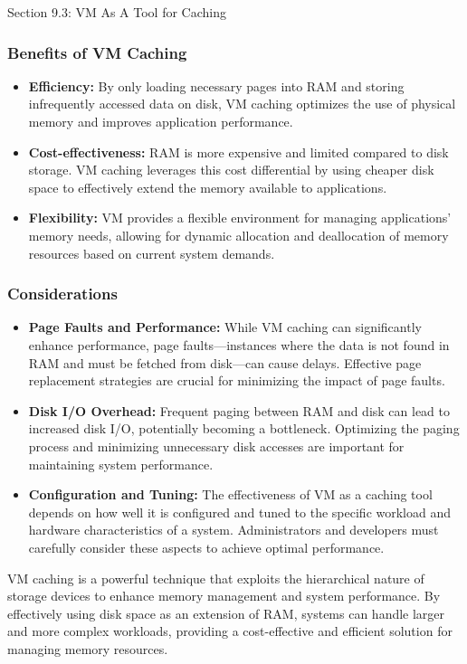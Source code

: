 \begin{notes}{Section 9.3: VM As A Tool for Caching}
    \subsubsection*{Benefits of VM Caching}
    
    \begin{itemize}
        \item \textbf{Efficiency:} By only loading necessary pages into RAM and storing infrequently accessed data on disk, VM caching optimizes the use of physical memory and improves application performance.
        \item \textbf{Cost-effectiveness:} RAM is more expensive and limited compared to disk storage. VM caching leverages this cost differential by using cheaper disk space to effectively extend 
        the memory available to applications.
        \item \textbf{Flexibility:} VM provides a flexible environment for managing applications' memory needs, allowing for dynamic allocation and deallocation of memory resources based on current 
        system demands.
    \end{itemize}
    
    \subsubsection*{Considerations}
    
    \begin{itemize}
        \item \textbf{Page Faults and Performance:} While VM caching can significantly enhance performance, page faults—instances where the data is not found in RAM and must be fetched from disk—can 
        cause delays. Effective page replacement strategies are crucial for minimizing the impact of page faults.
        \item \textbf{Disk I/O Overhead:} Frequent paging between RAM and disk can lead to increased disk I/O, potentially becoming a bottleneck. Optimizing the paging process and minimizing unnecessary 
        disk accesses are important for maintaining system performance.
        \item \textbf{Configuration and Tuning:} The effectiveness of VM as a caching tool depends on how well it is configured and tuned to the specific workload and hardware characteristics of a 
        system. Administrators and developers must carefully consider these aspects to achieve optimal performance.
    \end{itemize}
    
    VM caching is a powerful technique that exploits the hierarchical nature of storage devices to enhance memory management and system performance. By effectively using disk space as an extension of 
    RAM, systems can handle larger and more complex workloads, providing a cost-effective and efficient solution for managing memory resources.    
\end{notes}

